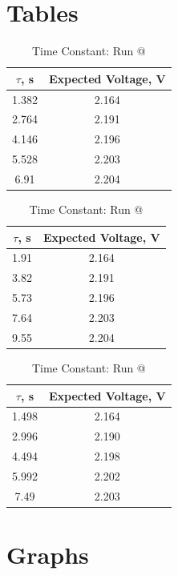 \documentclass[a4,11pt]{article}
\makeatletter
\newcommand*{\rom}[1]{\expandafter\@slowromancap\romannumeral #1@}
\makeatother
\begin{document}
\section{Tables}
\begin{table}[H]
	\centering
	\caption{Time Constant: Run \rom{1}}
	\label{const1}
	\begin{tabular}{c|c}
		$\tau$, s  &  Expected Voltage, V \\
		\hline
		1.382 &  2.164 \\
		2.764 &  2.191 \\
		4.146 & 2.196 \\
		5.528 & 2.203 \\
		6.91 & 2.204 \\
	\end{tabular}
\end{table}
\begin{table}[H]
	\centering
	\caption{Time Constant: Run \rom{2}}
	\label{const2}
	\begin{tabular}{c|c}
		$\tau$, s  &  Expected Voltage, V \\
		\hline
		1.91 &  2.164 \\
		3.82 &  2.191 \\
		5.73 & 2.196 \\
		7.64 & 2.203 \\
		9.55 & 2.204 \\
	\end{tabular}
\end{table}
\begin{table}[H]
	\centering
	\caption{Time Constant: Run \rom{3}}
	\label{const3}
	\begin{tabular}{c|c}
		$\tau$, s  &  Expected Voltage, V \\
		\hline
		1.498 &  2.164 \\
		2.996 &  2.190 \\
		4.494 & 2.198 \\
		5.992 & 2.202 \\
		7.49 & 2.203 \\
	\end{tabular}
\end{table}
\section{Graphs}
\end{document}
